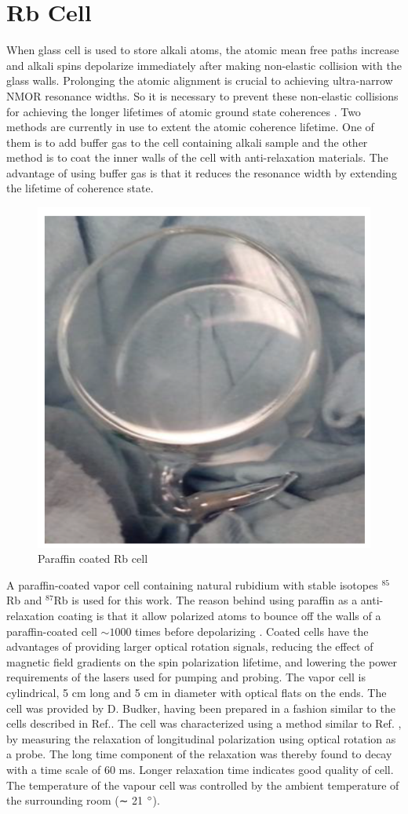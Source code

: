 \section{Rb Cell}
When glass cell is used to store alkali atoms, the atomic mean free paths increase and alkali spins depolarize immediately after making non-elastic collision with the glass walls. Prolonging the atomic alignment is crucial to achieving ultra-narrow NMOR resonance widths. So it is necessary to prevent these non-elastic collisions for achieving the longer lifetimes of atomic ground state coherences \cite{PhysRevA.72.023401,Balabas:10,doi:10.1063/1.3236649}. Two methods are currently in use to extent the atomic coherence lifetime. One of them is to add buffer gas to the cell containing alkali sample and the other method is to coat the inner walls of the cell with anti-relaxation materials. The advantage of using buffer gas is that it reduces the resonance width by extending the lifetime of coherence state. 
\begin{figure}[h]
\centering
\includegraphics[width=0.5\linewidth]{figures/cell}
\caption{Paraffin coated Rb cell}
\end{figure}
A paraffin-coated vapor cell containing  natural rubidium with stable isotopes $^{85}$Rb and $^{87}$Rb is used for this work. The reason behind using paraffin as a anti-relaxation coating is that it allow polarized atoms to bounce off the walls of a paraffin-coated cell $\sim 1000$ times before depolarizing \cite{PhysRev.147.41,PhysRevA.72.023401}. Coated cells have the advantages of providing larger optical rotation
signals, reducing the effect of magnetic field gradients on the spin polarization lifetime,
and lowering the power requirements of the lasers used for pumping and probing. The vapor cell is cylindrical, 5 cm long and 5 cm in diameter with optical
flats on the ends. The cell was provided by D. Budker, having been prepared in
a fashion similar to the cells described in Ref.\cite{PhysRevA.72.023401}. The cell was characterized
using a method similar to Ref. \cite{PhysRevA.72.023401}, by measuring the relaxation of longitudinal
polarization using optical rotation as a probe. The long time component of the relaxation was thereby found to decay with a time scale of 60 ms.  Longer relaxation time indicates good quality of cell. The temperature of the vapour cell was controlled by the ambient temperature of the surrounding room (∼ 21 $\degree$). 

